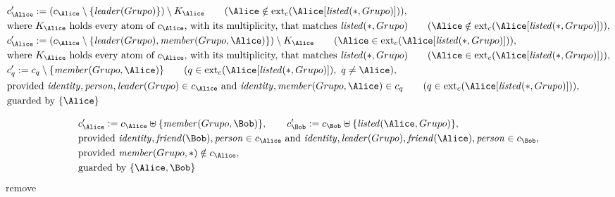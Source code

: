 \begin{align*}
&
c'_
{
\Alice
}
 := 
(c_
{
\Alice
}
 \setminus 
\{
\mathit{
leader
}
(
Grupo
)
\}
) \setminus K_
{
\Alice
}
 \qquad (
\Alice
 \notin 
\mathrm{ext}_c(
\Alice
[
\mathit{
listed
}
(
\ast
,
Grupo
)
]
)
)
,\\
&
\text{where } K_
{
\Alice
}
 \text{ holds every atom of } c_
{
\Alice
}
 \text{, with its multiplicity, that matches } 
\mathit{
listed
}
(
\ast
,
Grupo
)
 \qquad (
\Alice
 \notin 
\mathrm{ext}_c(
\Alice
[
\mathit{
listed
}
(
\ast
,
Grupo
)
]
)
)
,\\
&
c'_
{
\Alice
}
 := 
(c_
{
\Alice
}
 \setminus 
\{
\mathit{
leader
}
(
Grupo
)
,
\mathit{
member
}
(
Grupo
,
\Alice
)
\}
) \setminus K_
{
\Alice
}
 \qquad (
\Alice
 \in 
\mathrm{ext}_c(
\Alice
[
\mathit{
listed
}
(
\ast
,
Grupo
)
]
)
)
,\\
&
\text{where } K_
{
\Alice
}
 \text{ holds every atom of } c_
{
\Alice
}
 \text{, with its multiplicity, that matches } 
\mathit{
listed
}
(
\ast
,
Grupo
)
 \qquad (
\Alice
 \in 
\mathrm{ext}_c(
\Alice
[
\mathit{
listed
}
(
\ast
,
Grupo
)
]
)
)
,\\
&
c'_
q
 := 
c_
q
 \setminus 
\{
\mathit{
member
}
(
Grupo
,
\Alice
)
\}
 \qquad (
q
 \in 
\mathrm{ext}_c(
\Alice
[
\mathit{
listed
}
(
\ast
,
Grupo
)
]
)
,\ 
q \neq 
\Alice
)
,\\
&
\text{provided } 
\mathit{
identity
}
,
\mathit{
person
}
,
\mathit{
leader
}
(
Grupo
)
 \in c_
{
\Alice
}
 \text{ and } 
\mathit{
identity
}
,
\mathit{
member
}
(
Grupo
,
\Alice
)
 \in c_
q
 \qquad (
q \in 
\mathrm{ext}_c(
\Alice
[
\mathit{
listed
}
(
\ast
,
Grupo
)
]
)
)
,\\
&
\text{guarded by } \{
\Alice
\}
\end{align*}

\begin{align*}
&
c'_
{
\Alice
}
 := 
c_
{
\Alice
}
 \uplus 
\{
\mathit{
member
}
(
Grupo
,
\Bob
)
\}
, \qquad 
c'_
{
\Bob
}
 := 
c_
{
\Bob
}
 \uplus 
\{
\mathit{
listed
}
(
\Alice
,
Grupo
)
\}
,\\
&
\text{provided } 
\mathit{
identity
}
,
\mathit{
friend
}
(
\Bob
)
,
\mathit{
person
}
 \in c_
{
\Alice
}
 \text{ and } 
\mathit{
identity
}
,
\mathit{
leader
}
(
Grupo
)
,
\mathit{
friend
}
(
\Alice
)
,
\mathit{
person
}
 \in c_
{
\Bob
}
,\\
&
\text{provided } 
\mathit{
member
}
(
Grupo
,
\ast
)
 \notin c_
{
\Alice
}
,\\
&
\text{guarded by } \{
\Alice
,
\Bob
\}
\end{align*}
\iffalse
remove
